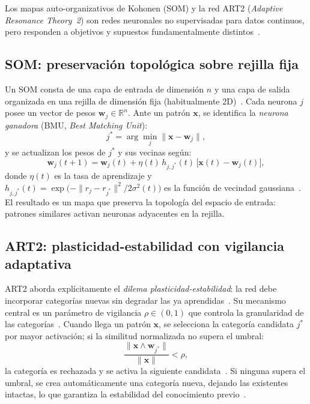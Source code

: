 Los mapas auto-organizativos de Kohonen (SOM) y la red ART2 (\textit{Adaptive Resonance Theory~2}) son redes neuronales no supervisadas para datos continuos, pero responden a objetivos y supuestos fundamentalmente distintos~\cite{jain1999clustering}.

\subsection*{SOM: preservación topológica sobre rejilla fija}

Un SOM consta de una capa de entrada de dimensión $n$ y una capa de salida organizada en una rejilla de dimensión fija (habitualmente 2D)~\cite{kohonen1990som}. Cada neurona $j$ posee un vector de pesos $\mathbf{w}_j \in \mathbb{R}^n$. Ante un patrón $\mathbf{x}$, se identifica la \emph{neurona ganadora} (BMU, \textit{Best Matching Unit}):
\[
j^* = \arg\min_{j} \|\mathbf{x} - \mathbf{w}_j\|,
\]
y se actualizan los pesos de $j^*$ y sus vecinas según:
\[
\mathbf{w}_j(t+1) = \mathbf{w}_j(t) + \eta(t)\,h_{j,j^*}(t)\,\bigl[\mathbf{x}(t) - \mathbf{w}_j(t)\bigr],
\]
donde $\eta(t)$ es la tasa de aprendizaje y $h_{j,j^*}(t) = \exp\!\bigl(-\|r_j - r_{j^*}\|^2 / 2\sigma^2(t)\bigr)$ es la función de vecindad gaussiana~\cite{kohonen1990som}. El resultado es un mapa que preserva la topología del espacio de entrada: patrones similares activan neuronas adyacentes en la rejilla.

\subsection*{ART2: plasticidad-estabilidad con vigilancia adaptativa}

ART2 aborda explícitamente el \emph{dilema plasticidad-estabilidad}: la red debe incorporar categorías nuevas sin degradar las ya aprendidas~\cite{grossberg1987competitive}. Su mecanismo central es un parámetro de vigilancia $\rho \in (0,1)$ que controla la granularidad de las categorías~\cite{carpenter1987art2}. Cuando llega un patrón $\mathbf{x}$, se selecciona la categoría candidata $j^*$ por mayor activación; si la similitud normalizada no supera el umbral:
\[
\frac{\|\mathbf{x} \wedge \mathbf{w}_{j^*}\|}{\|\mathbf{x}\|} < \rho,
\]
la categoría es rechazada y se activa la siguiente candidata~\cite{carpenter1987art2}. Si ninguna supera el umbral, se crea automáticamente una categoría nueva, dejando las existentes intactas, lo que garantiza la estabilidad del conocimiento previo~\cite{grossberg1987competitive}.

